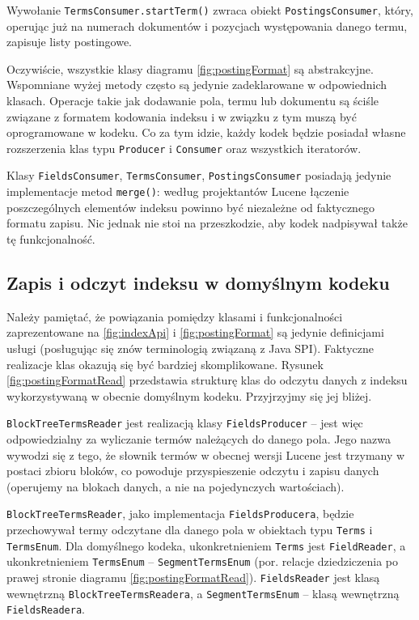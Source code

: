 Wywołanie \texttt{TermsConsumer.startTerm()} zwraca obiekt \texttt{PostingsConsumer}, który, operując już na numerach dokumentów i pozycjach występowania danego termu, zapisuje listy postingowe.

Oczywiście, wszystkie klasy diagramu \ref{fig:postingFormat} są abstrakcyjne. Wspomniane wyżej metody często są jedynie zadeklarowane w odpowiednich klasach. Operacje takie jak dodawanie pola, termu lub dokumentu są ściśle związane z formatem kodowania indeksu i w związku z tym muszą być oprogramowane w kodeku. Co za tym idzie, każdy kodek będzie posiadał własne rozszerzenia klas typu \texttt{Producer} i \texttt{Consumer} oraz wszystkich iteratorów. 

Klasy \texttt{FieldsConsumer}, \texttt{TermsConsumer}, \texttt{PostingsConsumer} posiadają jedynie implementacje metod \texttt{merge()}: według projektantów Lucene łączenie poszczególnych elementów indeksu powinno być niezależne od faktycznego formatu zapisu. Nic jednak nie stoi na przeszkodzie, aby kodek nadpisywał także tę funkcjonalność.

\subsection{Zapis i odczyt indeksu w domyślnym kodeku}

Należy pamiętać, że powiązania pomiędzy klasami i funkcjonalności zaprezentowane na \ref{fig:indexApi} i \ref{fig:postingFormat} są jedynie definicjami usługi (posługując się znów terminologią związaną z Java SPI). Faktyczne realizacje klas okazują się być bardziej skomplikowane. Rysunek \ref{fig:postingFormatRead} przedstawia strukturę klas do odczytu danych z indeksu wykorzystywaną w obecnie domyślnym kodeku. Przyjrzyjmy się jej bliżej.

\texttt{BlockTreeTermsReader} jest realizacją klasy \texttt{FieldsProducer} -- jest więc odpowiedzialny za wyliczanie termów należących do danego pola. Jego nazwa wywodzi się z tego, że słownik termów w obecnej wersji Lucene jest trzymany w postaci zbioru bloków, co powoduje przyspieszenie odczytu i zapisu danych (operujemy na blokach danych, a nie na pojedynczych wartościach). 

\texttt{BlockTreeTermsReader}, jako implementacja \texttt{FieldsProducera}, będzie przechowywał termy odczytane dla danego pola w obiektach typu \texttt{Terms} i \texttt{TermsEnum}. Dla domyślnego kodeka, ukonkretnieniem \texttt{Terms} jest \texttt{FieldReader}, a ukonkretnieniem \texttt{TermsEnum} -- \texttt{SegmentTermsEnum} (por. relacje dziedziczenia po prawej stronie diagramu \ref{fig:postingFormatRead}). \texttt{FieldsReader} jest klasą wewnętrzną \texttt{BlockTreeTermsReadera}, a \texttt{SegmentTermsEnum} -- klasą wewnętrzną \texttt{FieldsReadera}. 

